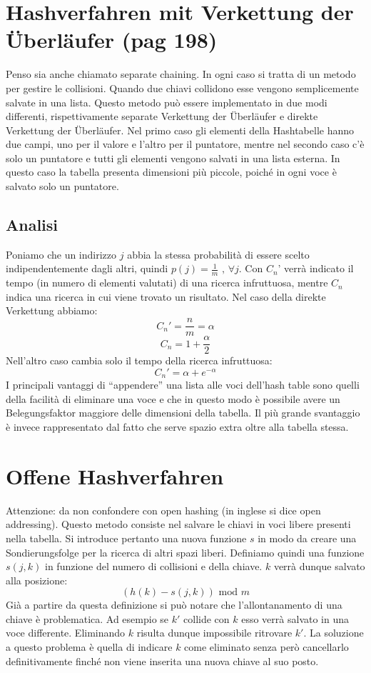 \documentclass[a4paper]{book}
\begin{document}
\section{Hashverfahren mit Verkettung der Überläufer (pag 198)}
Penso sia anche chiamato separate chaining. In ogni caso si tratta di un metodo per gestire le collisioni. Quando due chiavi collidono esse vengono semplicemente salvate in una lista. Questo metodo può essere implementato in due modi differenti, rispettivamente separate Verkettung der Überläufer e direkte Verkettung der Überläufer. Nel primo caso gli elementi della Hashtabelle hanno due campi, uno per il valore e l'altro per il puntatore, mentre nel secondo caso c'è solo un puntatore e tutti gli elementi vengono salvati in una lista esterna. In questo caso la tabella presenta dimensioni più piccole, poiché in ogni voce è salvato solo un puntatore.
\subsection*{Analisi}
Poniamo che un indirizzo $j$ abbia la stessa probabilità di essere scelto indipendentemente dagli altri, quindi $p(j)=\frac{1}{m} \mbox{ , } \forall j$. Con $C_n$' verrà indicato il tempo (in numero di elementi valutati) di una ricerca infruttuosa, mentre $C_n$ indica una ricerca in cui viene trovato un risultato. Nel caso della direkte Verkettung abbiamo:
$$ C_n '=\frac{n}{m}=\alpha $$
$$ C_n = 1+\frac{\alpha}{2} $$
Nell'altro caso cambia solo il tempo della ricerca infruttuosa:
$$C_n '=\alpha + e^{-\alpha} $$
I principali vantaggi di ``appendere'' una lista alle voci dell'hash table sono quelli della facilità di eliminare una voce e che in questo modo è possibile avere un Belegungsfaktor maggiore delle dimensioni della tabella. Il più grande svantaggio è invece rappresentato dal fatto che serve spazio extra oltre alla tabella stessa.
\section{Offene Hashverfahren}
Attenzione: da non confondere con open hashing (in inglese si dice open addressing). Questo metodo consiste nel salvare le chiavi in voci libere presenti nella tabella. Si introduce pertanto una nuova funzione $s$ in modo da creare una Sondierungsfolge per la ricerca di altri spazi liberi. Definiamo quindi una funzione $s(j,k)$ in funzione del numero di collisioni e della chiave. $k$ verrà dunque salvato alla posizione:
$$(h(k)-s(j,k))\mbox{ mod }m$$
Già a partire da questa definizione si può notare che l'allontanamento di una chiave è problematica. Ad esempio se $k'$ collide con $k$ esso verrà salvato in una voce differente. Eliminando $k$ risulta dunque impossibile ritrovare $k'$. La soluzione a questo problema è quella di indicare $k$ come eliminato senza però cancellarlo definitivamente finché non viene inserita una nuova chiave al suo posto.
\end{document}
